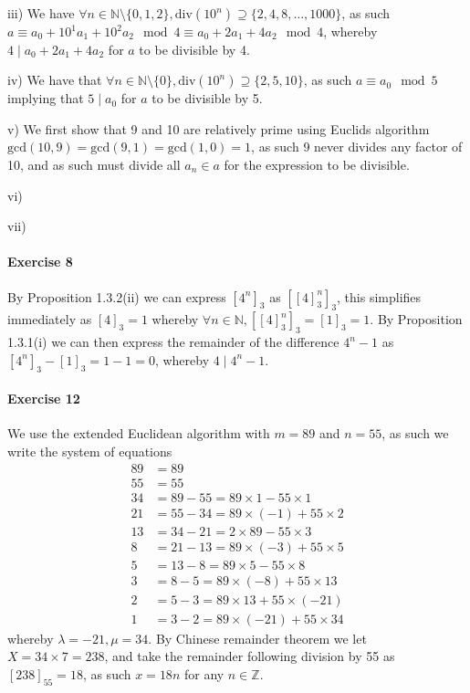iii) We have $\forall n\in\mathbb{N}\setminus\{0,1,2\},\text{div}(10^{n})\supseteq\{2,4,8,\ldots,1000\}$, as such $a\equiv a_{0}+10^{1}a_{1}+10^{2}a_{2}\mod 4\equiv a_{0}+2a_{1}+4a_{2}\mod 4$, whereby $4\mid a_{0}+2a_{1}+4a_{2}$ for $a$ to be divisible by 4.


iv) We have that $\forall n\in\mathbb{N}\setminus\{0\},\text{div}(10^{n})\supseteq\{2,5,10\}$, as such $a\equiv a_{0}\mod 5$ implying that $5\mid a_{0}$ for $a$ to be divisible by 5.

v) We first show that 9 and 10 are relatively prime using Euclids algorithm $\text{gcd}(10,9)=\text{gcd}(9,1)=\text{gcd}(1,0)=1$, as such 9 never divides any factor of 10, and as such must divide all $a_{n}\in a$ for the expression to be divisible.

vi)

vii)

\paragraph{Exercise 8}
By Proposition 1.3.2(ii) we can express $[4^{n}]_{3}$ as $[[4]_{3}^{n}]_{3}$, this simplifies immediately as $[4]_{3}=1$ whereby $\forall n\in\mathbb{N},[[4]_{3}^{n}]_{3}=[1]_{3}=1$. By Proposition 1.3.1(i) we can then express the remainder of the difference $4^{n}-1$ as $[4^{n}]_{3}-[1]_{3}=1-1=0$, whereby $4\mid 4^{n}-1$.
\paragraph{Exercise 12}
We use the extended Euclidean algorithm with $m=89$ and $n=55$, as such we write the system of equations
\begin{align*}
    89&=89 \\
    55&=55 \\
    34&=89-55=89\times 1-55\times 1 \\
    21&=55-34=89\times(-1)+55\times 2 \\
    13&=34-21=2\times 89-55\times 3 \\
    8&=21-13=89\times(-3)+55\times 5 \\
    5&=13-8=89\times 5-55\times 8 \\
    3&=8-5=89\times(-8)+55\times 13 \\
    2&=5-3=89\times 13+55\times(-21) \\
    1&=3-2=89\times(-21)+55\times34 
\end{align*}
whereby $\lambda=-21,\mu=34$. By Chinese remainder theorem we let $X=34\times 7=238$, and take the remainder following division by 55 as $[238]_{55}=18$, as such $x=18n$ for any $n\in\mathbb{Z}$.
